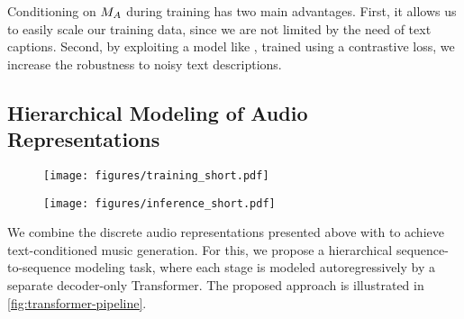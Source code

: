 Conditioning on $M_A$ during training has two main advantages. First, it allows us to easily scale our training data, since we are not limited by the need of text captions. Second, by exploiting a model like {\mulan}, trained using a contrastive loss, we increase the robustness to noisy text descriptions.

\subsection{Hierarchical Modeling of Audio Representations}
\label{method-training-inference}

\begin{figure*}[t!]

    \centering
    \begin{subfigure}[b]{0.59\textwidth}
        \centering
        \texttt{[image: figures/training\_short.pdf]}
        \label{fig:training}
    \end{subfigure}
    \hfill
    \begin{subfigure}[b]{0.40\textwidth}
        \centering
        \texttt{[image: figures/inference\_short.pdf]}
        \label{fig:inference}
    \end{subfigure}
\vspace{-6mm}
\caption{Left: During training we extract the {\mulan} audio tokens, semantic tokens, and acoustic tokens from the \emph{audio-only} training set. In the semantic modeling stage, we predict semantic tokens using {\mulan} audio tokens as conditioning. In the subsequent acoustic modeling stage, we predict acoustic tokens, given both {\mulan} audio tokens and semantic tokens. Each stage is modeled as a sequence-to-sequence task using decoder-only Transformers.
Right: During inference, we use {\mulan} text tokens computed from the text prompt as conditioning signal and convert the generated audio tokens to waveforms using the SoundStream decoder.}
\label{fig:transformer-pipeline}
\vspace{-1mm}
\end{figure*}

We combine the discrete audio representations presented above with {\audiolm} to achieve text-conditioned music generation. For this, we propose a hierarchical sequence-to-sequence modeling task, where each stage is modeled autoregressively by a separate decoder-only Transformer. The proposed approach is illustrated in \cref{fig:transformer-pipeline}.

